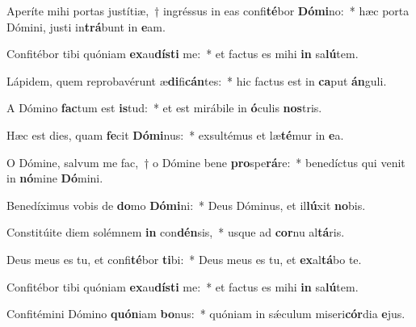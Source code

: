 \item Aperíte mihi portas justítiæ,~† ingréssus in eas confi\textbf{té}bor \textbf{Dó}\textbf{mi}no:~* hæc porta Dómini, justi in\textbf{trá}bunt in \textbf{e}am.
\item Confitébor tibi quóniam \textbf{ex}au\textbf{dís}\textbf{ti} me:~* et factus es mihi \textbf{in} sa\textbf{lú}tem.
\item Lápidem, quem reprobavérunt æ\textbf{di}fi\textbf{cán}tes:~* hic factus est in \textbf{ca}put \textbf{án}guli.
\item A Dómino \textbf{fac}tum est \textbf{is}tud:~* et est mirábile in \textbf{ó}culis \textbf{nos}tris.
\item Hæc est dies, quam \textbf{fe}cit \textbf{Dó}\textbf{mi}nus:~* exsultémus et læ\textbf{té}mur in \textbf{e}a.
\item O Dómine, salvum me fac,~† o Dómine bene \textbf{pro}spe\textbf{rá}re:~* benedíctus qui venit in \textbf{nó}mine \textbf{Dó}mini.
\item Benedíximus vobis de \textbf{do}mo \textbf{Dó}\textbf{mi}ni:~* Deus Dóminus, et il\textbf{lú}xit \textbf{no}bis.
\item Constitúite diem solémnem \textbf{in} con\textbf{dén}sis,~* usque ad \textbf{cor}nu al\textbf{tá}ris.
\item Deus meus es tu, et confi\textbf{té}bor \textbf{ti}bi:~* Deus meus es tu, et \textbf{ex}al\textbf{tá}bo te.
\item Confitébor tibi quóniam \textbf{ex}au\textbf{dís}\textbf{ti} me:~* et factus es mihi \textbf{in} sa\textbf{lú}tem.
\item Confitémini Dómino \textbf{quón}iam \textbf{bo}nus:~* quóniam in sǽculum miseri\textbf{cór}dia \textbf{e}jus.
